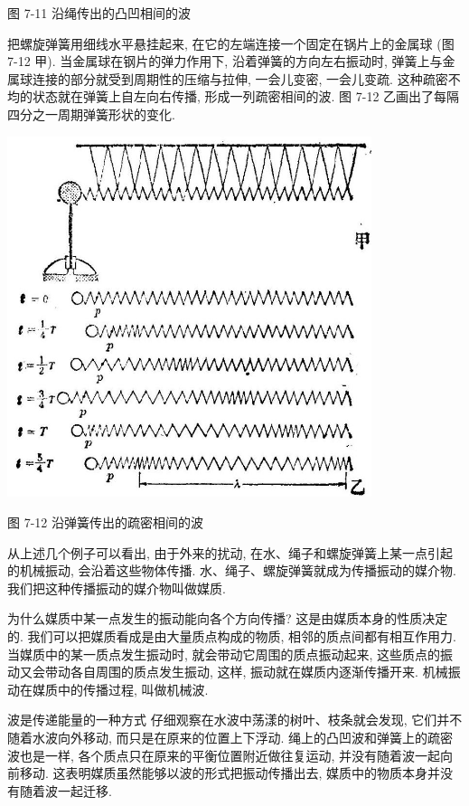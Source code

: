 \documentclass[10pt]{article}
\begin{document}
图 7-11 沿绳传出的凸凹相间的波

把螺旋弹簧用细线水平悬挂起来, 在它的左端连接一个固定在锅片上的金属球 (图 7-12 甲). 当金属球在钢片的弹力作用下, 沿着弹簧的方向左右振动时, 弹簧上与金属球连接的部分就受到周期性的压缩与拉伸, 一会儿变密, 一会儿变疏. 这种疏密不均的状态就在弹簧上自左向右传播, 形成一列疏密相间的波. 图 7-12 乙画出了每隔四分之一周期弹簧形状的变化.

\begin{center}
\includegraphics[max width=0.8\textwidth]{images/01912d55-147c-70aa-b0e0-1782a122f948_206_661226.jpg}
\end{center}

图 7-12 沿弹簧传出的疏密相间的波

从上述几个例子可以看出, 由于外来的扰动, 在水、绳子和螺旋弹簧上某一点引起的机械振动, 会沿着这些物体传播. 水、绳子、螺旋弹簧就成为传播振动的媒介物. 我们把这种传播振动的媒介物叫做媒质.

为什么媒质中某一点发生的振动能向各个方向传播? 这是由媒质本身的性质决定的. 我们可以把媒质看成是由大量质点构成的物质, 相邻的质点间都有相互作用力. 当媒质中的某一质点发生振动时, 就会带动它周围的质点振动起来, 这些质点的振动又会带动各自周围的质点发生振动, 这样, 振动就在媒质内逐渐传播开来. 机械振动在媒质中的传播过程, 叫做机械波.

波是传递能量的一种方式 仔细观察在水波中荡漾的树叶、枝条就会发现, 它们并不随着水波向外移动, 而只是在原来的位置上下浮动. 绳上的凸凹波和弹簧上的疏密波也是一样, 各个质点只在原来的平衡位置附近做往复运动, 并没有随着波一起向前移动. 这表明媒质虽然能够以波的形式把振动传播出去, 媒质中的物质本身并没有随着波一起迁移.
\end{document}
